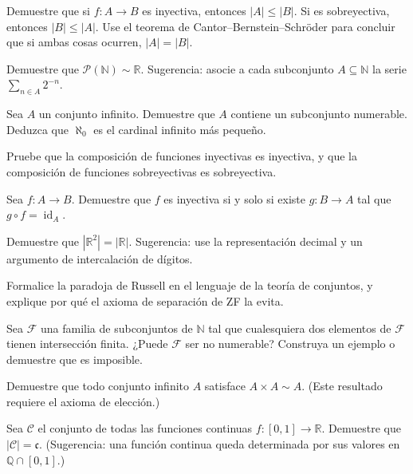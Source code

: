 \begin{exercise}
Demuestre que si $f\colon A\to B$ es inyectiva, entonces $|A|\leq|B|$. Si es sobreyectiva, entonces $|B|\leq|A|$. Use el teorema de Cantor--Bernstein--Schröder para concluir que si ambas cosas ocurren, $|A|=|B|$.
\end{exercise}

\begin{exercise}
Demuestre que $\mathcal{P}(\mathbb{N})\sim\mathbb{R}$. Sugerencia: asocie a cada subconjunto $A\subseteq\mathbb{N}$ la serie $\sum_{n\in A}2^{-n}$.
\end{exercise}

\begin{exercise}
Sea $A$ un conjunto infinito. Demuestre que $A$ contiene un subconjunto numerable. Deduzca que $\aleph_0$ es el cardinal infinito más pequeño.
\end{exercise}

\begin{exercise}
Pruebe que la composición de funciones inyectivas es inyectiva, y que la composición de funciones sobreyectivas es sobreyectiva.
\end{exercise}

\begin{exercise}
Sea $f\colon A\to B$. Demuestre que $f$ es inyectiva si y solo si existe $g\colon B\to A$ tal que $g\circ f=\operatorname{id}_A$.
\end{exercise}

\begin{exercise}
Demuestre que $|\mathbb{R}^2|=|\mathbb{R}|$. Sugerencia: use la representación decimal y un argumento de intercalación de dígitos.
\end{exercise}

\begin{exercise}
Formalice la paradoja de Russell en el lenguaje de la teoría de conjuntos, y explique por qué el axioma de separación de ZF la evita.
\end{exercise}

\begin{problem}
Sea $\mathcal{F}$ una familia de subconjuntos de $\mathbb{N}$ tal que cualesquiera dos elementos de $\mathcal{F}$ tienen intersección finita. ¿Puede $\mathcal{F}$ ser no numerable? Construya un ejemplo o demuestre que es imposible.
\end{problem}

\begin{problem}
Demuestre que todo conjunto infinito $A$ satisface $A\times A\sim A$. (Este resultado requiere el axioma de elección.)
\end{problem}

\begin{problem}
Sea $\mathcal{C}$ el conjunto de todas las funciones continuas $f\colon[0,1]\to\mathbb{R}$. Demuestre que $|\mathcal{C}|=\mathfrak{c}$. (Sugerencia: una función continua queda determinada por sus valores en $\mathbb{Q}\cap[0,1]$.)
\end{problem}

